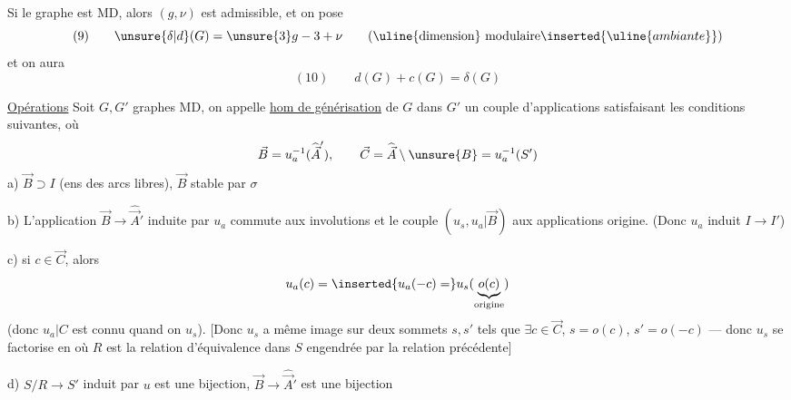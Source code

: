  Si le graphe est MD, alors $(g,\nu)$ est admissible, et on pose
\[
(9)\qquad \unsure{\delta|d}(G)=\unsure{3}g-3+\nu
\qquad (\uline{\text{dimension}}\ \text{modulaire}\inserted{\uline{ambiante}})
\]
et on aura
\[
(10)\qquad d(G)+c(G)=\delta(G)
\]

\uline{Opérations} 
Soit $G,G'$  graphes MD, on appelle \uline{hom de générisation}  de $G$ dans $G'$ un couple d'applications
satisfaisant les conditions suivantes, où
\[
\vec B=u_a^{-1}(\widehat{\vec A}'),\qquad
\vec C=\widehat{\vec A}\setminus\unsure{B}=u_a^{-1}(S')
\]
a) $\vec B\supset I$ (ens des arcs libres), $\vec B$ stable par $\sigma$

b) L'application $\vec B\longrightarrow\widehat{\vec A}'$ induite par $u_a$ commute aux involutions et le couple $(u_s,u_a|\vec B)$  aux applications origine.
(Donc $u_a$ induit $I\longrightarrow I'$)


c)  si $c\in\vec C$, alors
\[
u_a(c)=\inserted{u_a(-c)=}u_s(\underbrace{o(c)}_{\text{origine}})
\]
(donc $u_a|C$ est connu quand on  $u_s$). 
[Donc  $u_s$ a même image sur deux  sommets $s,s'$ tels que $\exists c\in\vec C$, $s=o(c)$, $s'=o(-c)$ --- donc $u_s$ se factorise en
où $R$ est la relation d'équivalence dans $S$ engendrée par la relation précédente]

d) $S/R\longrightarrow S'$ induit par $u$ est une bijection,
$\vec B\longrightarrow\widehat{\vec A}'$ est une bijection


